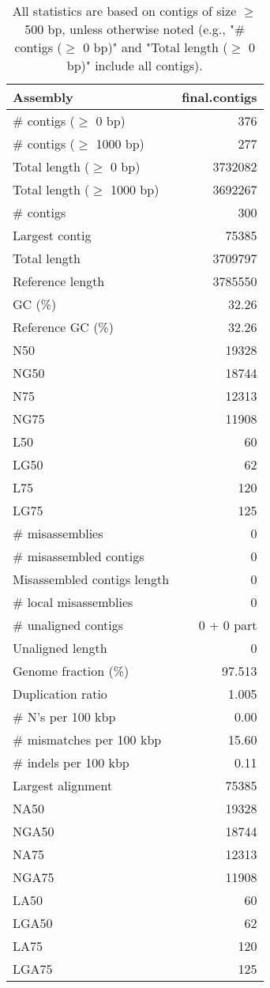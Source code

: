 \documentclass[12pt,a4paper]{article}
\begin{document}
\begin{table}[ht]
\begin{center}
\caption{All statistics are based on contigs of size $\geq$ 500 bp, unless otherwise noted (e.g., "\# contigs ($\geq$ 0 bp)" and "Total length ($\geq$ 0 bp)" include all contigs).}
\begin{tabular}{|l*{1}{|r}|}
\hline
Assembly & final.contigs \\ \hline
\# contigs ($\geq$ 0 bp) & 376 \\ \hline
\# contigs ($\geq$ 1000 bp) & 277 \\ \hline
Total length ($\geq$ 0 bp) & 3732082 \\ \hline
Total length ($\geq$ 1000 bp) & 3692267 \\ \hline
\# contigs & 300 \\ \hline
Largest contig & 75385 \\ \hline
Total length & 3709797 \\ \hline
Reference length & 3785550 \\ \hline
GC (\%) & 32.26 \\ \hline
Reference GC (\%) & 32.26 \\ \hline
N50 & 19328 \\ \hline
NG50 & 18744 \\ \hline
N75 & 12313 \\ \hline
NG75 & 11908 \\ \hline
L50 & 60 \\ \hline
LG50 & 62 \\ \hline
L75 & 120 \\ \hline
LG75 & 125 \\ \hline
\# misassemblies & 0 \\ \hline
\# misassembled contigs & 0 \\ \hline
Misassembled contigs length & 0 \\ \hline
\# local misassemblies & 0 \\ \hline
\# unaligned contigs & 0 + 0 part \\ \hline
Unaligned length & 0 \\ \hline
Genome fraction (\%) & 97.513 \\ \hline
Duplication ratio & 1.005 \\ \hline
\# N's per 100 kbp & 0.00 \\ \hline
\# mismatches per 100 kbp & 15.60 \\ \hline
\# indels per 100 kbp & 0.11 \\ \hline
Largest alignment & 75385 \\ \hline
NA50 & 19328 \\ \hline
NGA50 & 18744 \\ \hline
NA75 & 12313 \\ \hline
NGA75 & 11908 \\ \hline
LA50 & 60 \\ \hline
LGA50 & 62 \\ \hline
LA75 & 120 \\ \hline
LGA75 & 125 \\ \hline
\end{tabular}
\end{center}
\end{table}
\end{document}
